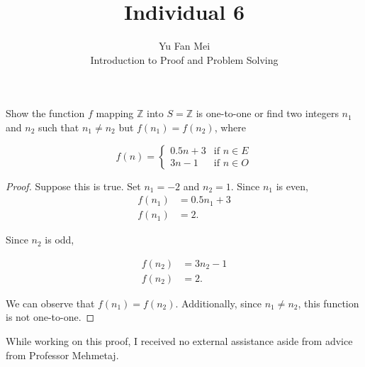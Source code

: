 \documentclass[12pt]{article}
\newenvironment{problem}[2][Problem]{\begin{trivlist}
\item[\hskip \labelsep {\bfseries #1}\hskip \labelsep {\bfseries #2.}]}{\end{trivlist}}
\begin{document}

\title{Individual 6}%
\author{Yu Fan Mei\\ %
	Introduction to Proof and Problem Solving} %

\maketitle

\begin{problem}{12} %
    Show the function $f$ mapping $\mathbb{Z}$ into $S = \mathbb{Z} $ is one-to-one or find two integers $n_1$ and $n_2$ such that $n_1 \neq n_2$ but $f(n_1) = f(n_2)$, where

    $$f(n) = 
        \begin{cases} 
        0.5n + 3 & \text{if } n \in E \\ 
        3n - 1 & \text{if } n \in O 
        \end{cases}$$


    
    

\end{problem}

\begin{proof} Suppose this is true. Set $n_1 = -2$ and $n_2 = 1$. Since $n_1$ is even, 
    \begin{align*} 
        f(n_1) & = 0.5n_1 + 3 \\
        f(n_1) & = 2.
    \end{align*}
    
    Since $n_2$ is odd,

    \begin{align*} 
        f(n_2) & = 3n_2 - 1 \\
        f(n_2) & = 2.
    \end{align*}

    We can observe that $f(n_1) = f(n_2)$. Additionally, since $n_1 \neq n_2$, this function is not one-to-one.


\end{proof}


\noindent While working on this proof, I received no external assistance aside from advice from Professor Mehmetaj.
\end{document}
